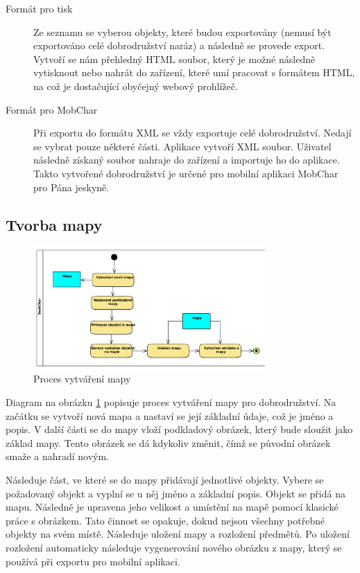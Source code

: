 \documentclass[thesis=B,czech]{resources/FITthesis}[2012/06/26]
\begin{document}
\begin{description}

\item[Formát pro tisk] Ze seznamu se vyberou objekty, které budou exportovány (nemusí být exportováno celé dobrodružství naráz) a následně se provede export. Vytvoří se nám přehledný HTML soubor, který je možné následně vytisknout nebo nahrát do zařízení, které umí pracovat s formátem HTML, na což je dostačující obyčejný webový prohlížeč.

\item[Formát pro MobChar] Při exportu do formátu XML se vždy exportuje celé dobrodružství. Nedají se vybrat pouze některé části. Aplikace vytvoří XML soubor. Uživatel následně získaný soubor nahraje do zařízení a importuje ho do aplikace. Takto vytvořené dobrodružství je určené pro mobilní aplikaci MobChar pro Pána jeskyně.

\end{description}

\subsection{Tvorba mapy}
\begin{figure}\centering
	\includegraphics[width=0.8\textwidth]{images/business_mapa}
	\caption[Proces vytváření mapy]{Proces vytváření mapy}\label{fig:bp_mapa}
\end{figure}	
Diagram na obrázku \ref{fig:bp_mapa} popisuje proces vytváření mapy pro dobrodružství. Na začátku se vytvoří nová mapa a nastaví se její základní údaje, což je jméno a popis. V další části se do mapy vloží podkladový obrázek, který bude sloužit jako základ mapy. Tento obrázek se dá kdykoliv změnit, čímž se původní obrázek smaže a nahradí novým. \par

Následuje část, ve které se do mapy přidávají jednotlivé objekty. Vybere se požadovaný objekt a vyplní se u něj jméno a základní popis. Objekt se přidá na mapu. Následně je upravena jeho velikost a umístění na mapě pomocí klasické práce s obrázkem. Tato činnost se opakuje, dokud nejsou všechny potřebné objekty na svém místě. Následuje uložení mapy a rozložení předmětů. Po uložení rozložení automaticky následuje vygenerování nového obrázku z mapy, který se používá při exportu pro mobilní aplikaci.
\end{document}
